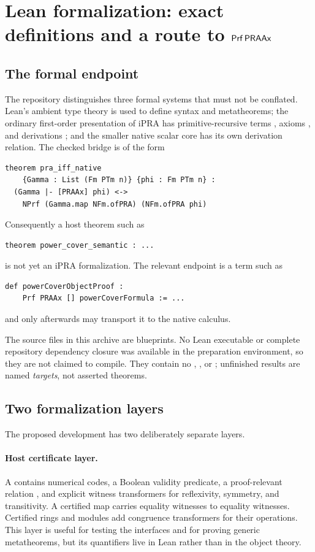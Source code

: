 \section{Lean formalization: exact definitions and a route to \texorpdfstring{$\mathsf{Prf}\,\mathsf{PRAAx}$}{Prf PRAAx}}

\subsection{The formal endpoint}

The repository distinguishes three formal systems that must not be conflated.  Lean's ambient type
 theory is used to define syntax and metatheorems; the ordinary first-order presentation of iPRA has
primitive-recursive terms , axioms , and derivations ; and the
smaller native scalar core has its own derivation relation.  The checked bridge is of the form
\begin{lstlisting}[language={}] 
theorem pra_iff_native
    {Gamma : List (Fm PTm n)} {phi : Fm PTm n} :
  (Gamma |- [PRAAx] phi) <->
    NPrf (Gamma.map NFm.ofPRA) (NFm.ofPRA phi)
\end{lstlisting}
Consequently a host theorem such as
\begin{lstlisting}[language={}] 
theorem power_cover_semantic : ...
\end{lstlisting}
is not yet an iPRA formalization.  The relevant endpoint is a term such as
\begin{lstlisting}[language={}] 
def powerCoverObjectProof :
    Prf PRAAx [] powerCoverFormula := ...
\end{lstlisting}
and only afterwards may  transport it to the native calculus.

The source files in this archive are blueprints.  No Lean executable or complete repository
dependency closure was available in the preparation environment, so they are not claimed to
compile.  They contain no , , or ; unfinished results are named
\emph{targets}, not asserted theorems.

\subsection{Two formalization layers}

The proposed development has two deliberately separate layers.

\paragraph{Host certificate layer.}
A  contains numerical codes, a Boolean validity predicate, a proof-relevant
relation , and explicit witness transformers for reflexivity, symmetry, and
transitivity.  A certified map carries equality witnesses to equality witnesses.  Certified rings
and modules add congruence transformers for their operations.  This layer is useful for testing the
interfaces and for proving generic metatheorems, but its quantifiers live in Lean rather than in the
object theory.

